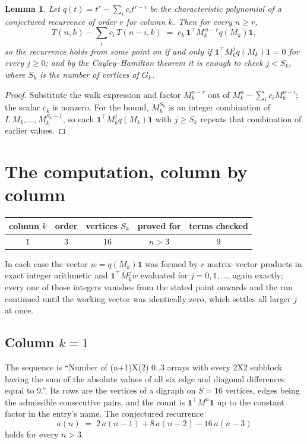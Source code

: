 \documentclass[11pt,a4paper]{article}
\theoremstyle{plain}
\newtheorem{lemma}[theorem]{Lemma}
\theoremstyle{definition}
\begin{document}
\begin{lemma}\label{lem:crit}
Let $q(t)=t^{r}-\sum_i c_it^{r-i}$ be the characteristic polynomial of a conjectured
recurrence of order $r$ for column $k$. Then for every $n\ge r$,
\[
T(n,k)-\sum_i c_i\,T(n-i,k)\;=\;c_k\,\mathbf{1}^{\!\top}M_k^{\,n-r}q(M_k)\mathbf{1},
\]
so the recurrence holds from some point on if and only if
$\mathbf{1}^{\!\top}M_k^{j}q(M_k)\mathbf{1}=0$ for every $j\ge0$; and by the
Cayley--Hamilton theorem it is enough to check $j<S_k$, where $S_k$ is the number of vertices
of $G_k$.
\end{lemma}

\begin{proof}
Substitute the walk expression and factor $M_k^{n-r}$ out of $M_k^{n}-\sum_ic_iM_k^{n-i}$;
the scalar $c_k$ is nonzero. For the bound, $M_k^{S_k}$ is an integer combination of
$I,M_k,\dots,M_k^{S_k-1}$, so each $\mathbf{1}^{\!\top}M_k^{j}q(M_k)\mathbf{1}$ with
$j\ge S_k$ repeats that combination of earlier values.
\end{proof}

\section{The computation, column by column}

\begin{center}
\begin{tabular}{ccccc}
column $k$ & order & vertices $S_k$ & proved for & terms checked \\ \hline
$1$ & $3$ & $16$ & $n>3$ & $9$ \\
\end{tabular}
\end{center}

In each case the vector $w=q(M_k)\mathbf{1}$ was formed by $r$ matrix--vector products in
exact integer arithmetic and $\mathbf{1}^{\!\top}M_k^{j}w$ evaluated for $j=0,1,\dots$,
again exactly; every one of those integers vanishes from the stated point onwards and the run
continued until the working vector was identically zero, which settles all larger $j$ at once.

\subsection*{Column $k=1$}
The sequence is ``Number of (n+1)X(2) 0..3 arrays with every 2X2 subblock having the sum of the absolute values of all six edge and diagonal differences equal to 9.''. Its rows are the vertices of a digraph on
$S=16$ vertices, edges being the admissible consecutive pairs, and the count is
$\mathbf{1}^{\!\top}M^{n}\mathbf{1}$ up to the constant factor in the entry's name.
The conjectured recurrence
\[
a(n)\;=\;2\,a(n-1) + 8\,a(n-2) - 16\,a(n-3)
\]
holds for every $n>3$.
\end{document}
